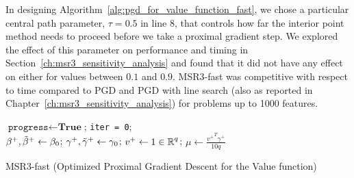 In designing Algorithm~\ref{alg:pgd_for_value_function_fast}, we chose a particular central path parameter, $\tau = 0.5$ in line 8, 
that controls how far the interior point method needs to proceed before we take a proximal gradient step. We explored the effect of this parameter
on performance and timing in Section~\ref{ch:msr3_sensitivity_analysis} and found that it did not have any effect on either for values between $0.1$ and $0.9$. MSR3-fast 
was competitive with respect to time compared to PGD and PGD with line search (also as reported in Chapter~\ref{ch:msr3_sensitivity_analysis}) for problems up to 1000 features. 

\begin{algorithm}[!ht]
\SetAlgoLined
$\texttt{progress}\leftarrow \textbf{True}$; \quad \texttt{iter = 0}; \\
$\beta^+, \tilde\beta^+\leftarrow\beta_0$; 
\quad $\gamma^+, \tilde\gamma^+\leftarrow\gamma_0$;  
\quad $v^+ \leftarrow 1 \in \operatorname{\mathbb{R}}^q$; 
\quad  $\mu \leftarrow \frac{{v^+}^T\gamma^+}{10 q}$\\
 \Return{$\tbeta^+$, $\tgamma^+$}
 \caption{\label{alg:pgd_for_value_function_fast}MSR3-fast (Optimized Proximal Gradient Descent for the Value function)}
\end{algorithm}


